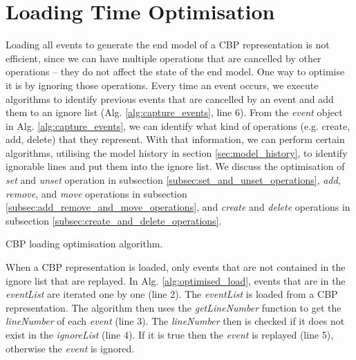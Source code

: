 \documentclass{llncs}
\begin{document}
\section{Loading Time Optimisation}
\label{sec:loading_time_optimisation}
Loading all events to generate the end model of a CBP representation is not efficient, since we can have multiple operations that are cancelled by other operations -- they do not affect the state of the end model. One way to optimise it is by ignoring those operations. Every time an event occurs, we execute algorithms to identify previous events that are cancelled by an event and add them to an ignore list (Alg. \ref{alg:capture_events}, line 6). From the \emph{event} object in Alg. \ref{alg:capture_events}, we can identify what kind of  operations (e.g. create, add, delete) that they represent. With that information, we can perform certain algorithms, utilising the model history in section \ref{sec:model_history}, to identify ignorable lines and put them into the ignore list. We discuss the optimisation of \emph{set} and \emph{unset} operation in subsection \ref{subsec:set_and_unset_operations}, \emph{add}, \emph{remove}, and \emph{move} operations in subsection \ref{subsec:add_remove_and_move_operations}, and \emph{create} and \emph{delete} operations in subsection \ref{subsec:create_and_delete_operations}.

\begin{algorithm}
\begin{small}
\end{small}
\caption{CBP loading optimisation algorithm.}
\label{alg:optimised_load}
\end{algorithm}

When a CBP representation is loaded, only events that are not contained in the ignore list that are replayed. In Alg. \ref{alg:optimised_load}, events that are in the \emph{eventList} are iterated one by one (line 2). The \emph{eventList} is loaded from a CBP representation. The algorithm then uses the \emph{getLineNumber} function to get the \emph{lineNumber} of each \emph{event} (line 3). The \emph{lineNumber} then is checked if it does not exist in the \emph{ignoreList} (line 4). If it is true then the \emph{event} is replayed (line 5), otherwise the \emph{event} is ignored.   
\end{document}
